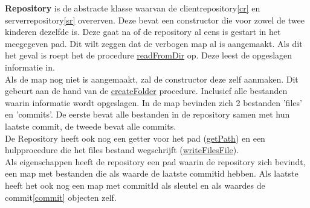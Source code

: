 \documentclass{article}
\begin{document}
\textbf{Repository} is de abstracte klasse waarvan de clientrepository\ref{cr} en serverrepository\ref{sr} overerven. Deze bevat een constructor die voor zowel de twee kinderen dezelfde is. Deze gaat na of de repository al eens is gestart in het meegegeven pad. Dit wilt zeggen dat de verbogen map al is aangemaakt. Als dit het geval is roept het de procedure \underline{readFromDir} op. Deze leest de opgeslagen informatie in.\\
Als de map nog niet is aangemaakt, zal de constructor deze zelf aanmaken. Dit gebeurt aan de hand van de \underline{createFolder} procedure. Inclusief alle bestanden waarin informatie wordt opgeslagen. In de map bevinden zich 2 bestanden 'files' en 'commits'. De eerste bevat alle bestanden in de repository samen met hun laatste commit, de tweede bevat alle commits.\\
De Repository heeft ook nog een getter voor het pad (\underline{getPath}) en een hulpprocedure die het files bestand wegschrijft (\underline{writeFilesFile}).\\
Als eigenschappen heeft de repository een pad waarin de repository zich bevindt, een map met bestanden die als waarde de laatste commitid hebben. Als laatste heeft het ook nog een map met commitId als sleutel en als waardes de commit\ref{commit} objecten zelf.\\
\end{document}

